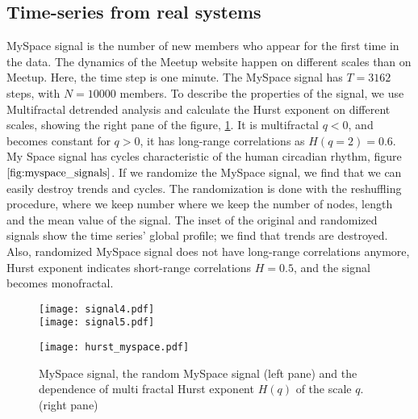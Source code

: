 \subsection{Time-series from real systems}

MySpace signal is the number of new members who appear for the first time in the data. The dynamics of the Meetup website happen on different scales than on Meetup. Here, the time step is one minute. The MySpace signal has $T = 3162$ steps, with  $N = 10000$ members.  To describe the properties of the signal, we use Multifractal detrended analysis and calculate the Hurst exponent on different scales, showing the right pane of the figure, \ref{fig:myspace_signals}. It is multifractal $q<0$, and becomes constant for $q>0$, it has long-range correlations as $H(q=2)=0.6$. My Space signal has cycles characteristic of the human circadian rhythm, figure $\ref{fig:myspace_signals}$. If we randomize the MySpace signal, we find that we can easily destroy trends and cycles. The randomization is done with the reshuffling procedure, where we keep number where we keep the number of nodes, length and the mean value of the signal. The inset of the original and randomized signals show the time series' global profile; we find that trends are destroyed. Also, randomized MySpace signal does not have long-range correlations anymore, Hurst exponent indicates short-range correlations $H=0.5$, and the signal becomes monofractal.    


\begin{figure}[H]
	\centering
	\begin{minipage}[b]{0.4\textwidth}
		\centering
		\texttt{[image: signal4.pdf]}\\
		\texttt{[image: signal5.pdf]}
	\end{minipage}
	\begin{minipage}[b]{0.45\textwidth}
		\centering
		\texttt{[image: hurst\_myspace.pdf]}
		\vspace{0.01cm}
	\end{minipage}
	\caption[Properties of MySpace signal.]{MySpace signal, the random MySpace signal (left pane) and the dependence of multi fractal Hurst exponent $H(q)$ of the scale $q$. (right pane)}
	\label{fig:myspace_signals}
\end{figure}

